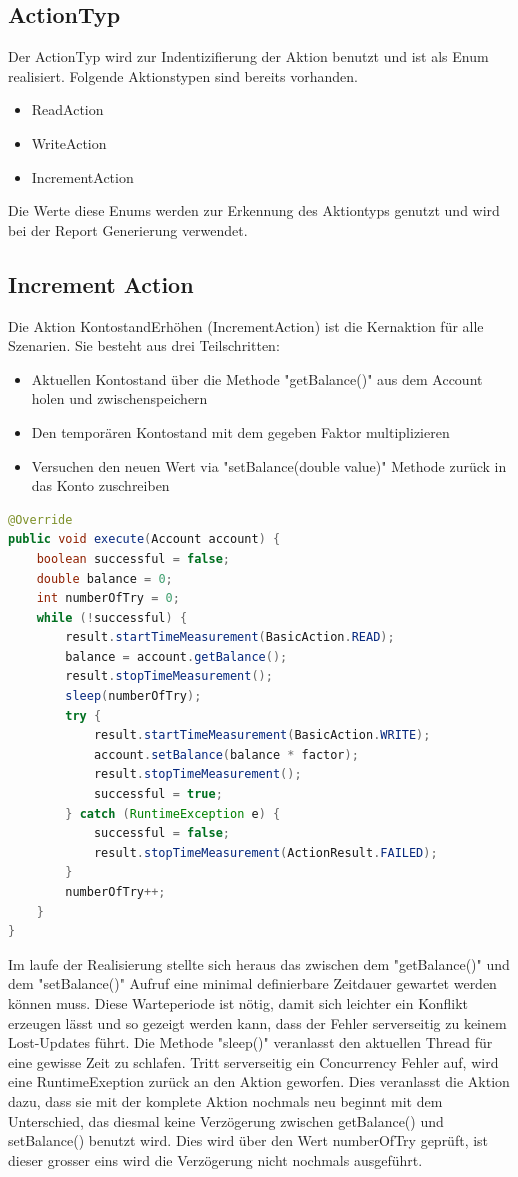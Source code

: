 \subsection{ActionTyp}
\label{sec:actionTyp}
Der ActionTyp wird zur Indentizifierung der Aktion benutzt und ist als Enum realisiert. Folgende Aktionstypen sind bereits vorhanden.
\begin{itemize}
\item ReadAction
\item WriteAction
\item IncrementAction
\end{itemize}
Die Werte diese Enums werden zur Erkennung des Aktiontyps genutzt und wird bei der Report Generierung verwendet.

 
\subsection{Increment Action}
\label{sec:incrementAction}
Die Aktion KontostandErhöhen (IncrementAction) ist die Kernaktion für alle Szenarien. 
Sie besteht aus drei Teilschritten:
\begin{itemize}
\item Aktuellen Kontostand über die Methode "getBalance()" aus dem Account holen und zwischenspeichern
\item Den temporären Kontostand mit dem gegeben Faktor multiplizieren
\item Versuchen den neuen Wert via "setBalance(double value)" Methode zurück in das Konto zuschreiben
\end{itemize}

\begin{lstlisting}[language=java, breaklines=true] 
@Override
public void execute(Account account) {
	boolean successful = false;
	double balance = 0;
	int numberOfTry = 0;
	while (!successful) {
		result.startTimeMeasurement(BasicAction.READ);
		balance = account.getBalance();
		result.stopTimeMeasurement();
		sleep(numberOfTry);
		try {
			result.startTimeMeasurement(BasicAction.WRITE);
			account.setBalance(balance * factor);
			result.stopTimeMeasurement();
			successful = true;
		} catch (RuntimeException e) {
			successful = false;
			result.stopTimeMeasurement(ActionResult.FAILED);
		}
		numberOfTry++;
	}
}
\end{lstlisting}
Im laufe der Realisierung stellte sich heraus das zwischen dem "getBalance()" und dem "setBalance()" Aufruf eine minimal definierbare Zeitdauer gewartet werden können muss. Diese Warteperiode ist nötig, damit sich leichter ein Konflikt erzeugen lässt und so gezeigt werden kann, dass der Fehler serverseitig zu keinem Lost-Updates führt. Die Methode "sleep()" veranlasst den aktuellen Thread für eine gewisse Zeit zu schlafen. Tritt serverseitig ein Concurrency Fehler auf, wird eine RuntimeExeption zurück an den Aktion geworfen. Dies veranlasst die Aktion dazu, dass sie mit der komplete Aktion nochmals neu beginnt mit dem Unterschied, das diesmal keine Verzögerung zwischen getBalance() und setBalance() benutzt wird. Dies wird über den Wert numberOfTry geprüft, ist dieser grosser eins wird die Verzögerung nicht nochmals ausgeführt.

